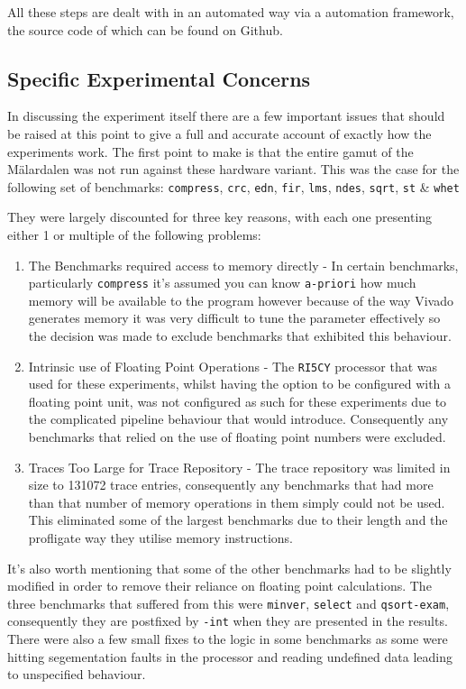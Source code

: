 All these steps are dealt with in an automated way via a automation framework, the source code of which can be found on Github. 

\subsection{Specific Experimental Concerns}

In discussing the experiment itself there are a few important issues that should be raised at this point to give a full and accurate account of exactly how the experiments work. The first point to make is that the entire gamut of the Mälardalen was not run against these hardware variant. This was the case for the following set of benchmarks: \texttt{compress}, \texttt{crc}, \texttt{edn}, \texttt{fir}, \texttt{lms}, \texttt{ndes}, \texttt{sqrt}, \texttt{st} \& \texttt{whet}

They were largely discounted for three key reasons, with each one presenting either 1 or multiple of the following problems:

\begin{enumerate}
	\item The Benchmarks required access to memory directly - In certain benchmarks, particularly \texttt{compress} it's assumed you can know \texttt{a-priori} how much memory will be available to the program however because of the way Vivado generates memory it was very difficult to tune the parameter effectively so the decision was made to exclude benchmarks that exhibited this behaviour.
	\item Intrinsic use of Floating Point Operations - The \texttt{RI5CY} processor that was used for these experiments, whilst having the option to be configured with a floating point unit, was not configured as such for these experiments due to the complicated pipeline behaviour that would introduce. Consequently any benchmarks that relied on the use of floating point numbers were excluded.
	\item Traces Too Large for Trace Repository - The trace repository was limited in size to 131072 trace entries, consequently any benchmarks that had more than that number of memory operations in them simply could not be used. This eliminated some of the largest benchmarks due to their length and the profligate way they utilise memory instructions.
\end{enumerate}

It's also worth mentioning that some of the other benchmarks had to be slightly modified in order to remove their reliance on floating point calculations. The three benchmarks that suffered from this were \texttt{minver}, \texttt{select} and \texttt{qsort-exam}, consequently they are postfixed by \texttt{-int} when they are presented in the results. There were also a few small fixes to the logic in some benchmarks as some were hitting segementation faults in the processor and reading undefined data leading to unspecified behaviour. 

